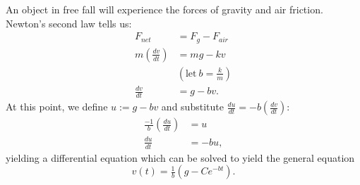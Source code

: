 \documentclass{article}
\begin{document}
\begin{example}
An object in free fall will experience the forces of gravity and air friction. Newton's second law tells us:
\begin{align*}
F_{net} & =F_{g} -F_{air}\\
m\left(\tfrac{dv}{dt}\right) & =mg-kv\\
 & \left(\text{let} \ b=\tfrac{k}{m}\right)\\
\tfrac{dv}{dt} & =g-bv.
\end{align*}
At this point, we define $\displaystyle u:=g-bv$ and substitute $\displaystyle \tfrac{du}{dt} =-b\left(\tfrac{dv}{dt}\right)$:
\begin{align*}
\tfrac{-1}{b}\left(\tfrac{du}{dt}\right) & =u\\
\tfrac{du}{dt} & =-bu,
\end{align*}
yielding a differential equation which can be solved to yield the general equation
\begin{equation*}
v( t) =\tfrac{1}{b}\left( g-Ce^{-bt}\right) .
\end{equation*}
\end{example}



\end{document}
